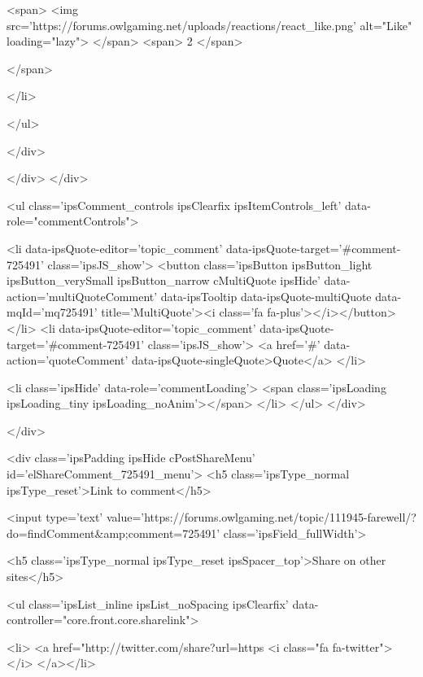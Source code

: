 							<span>
								<img src='https://forums.owlgaming.net/uploads/reactions/react_like.png' alt="Like" loading="lazy">
							</span>
							<span>
								2
							</span>
					
						</span>
					
				</li>
			
		
	</ul>

					
				</div>
			
			
			
		</div>
	</div>

					
				
				<ul class='ipsComment_controls ipsClearfix ipsItemControls_left' data-role="commentControls">
					
						
							<li data-ipsQuote-editor='topic_comment' data-ipsQuote-target='#comment-725491' class='ipsJS_show'>
								<button class='ipsButton ipsButton_light ipsButton_verySmall ipsButton_narrow cMultiQuote ipsHide' data-action='multiQuoteComment' data-ipsTooltip data-ipsQuote-multiQuote data-mqId='mq725491' title='MultiQuote'><i class='fa fa-plus'></i></button>
							</li>
							<li data-ipsQuote-editor='topic_comment' data-ipsQuote-target='#comment-725491' class='ipsJS_show'>
								<a href='#' data-action='quoteComment' data-ipsQuote-singleQuote>Quote</a>
							</li>
						
						
						
					
					<li class='ipsHide' data-role='commentLoading'>
						<span class='ipsLoading ipsLoading_tiny ipsLoading_noAnim'></span>
					</li>
				</ul>
			</div>
		

		
	</div>

	

	



<div class='ipsPadding ipsHide cPostShareMenu' id='elShareComment_725491_menu'>
	<h5 class='ipsType_normal ipsType_reset'>Link to comment</h5>
	
		
	
	
	<input type='text' value='https://forums.owlgaming.net/topic/111945-farewell/?do=findComment&amp;comment=725491' class='ipsField_fullWidth'>

	
	<h5 class='ipsType_normal ipsType_reset ipsSpacer_top'>Share on other sites</h5>
	

	<ul class='ipsList_inline ipsList_noSpacing ipsClearfix' data-controller="core.front.core.sharelink">
		
			<li>
<a href="http://twitter.com/share?url=https%
	<i class="fa fa-twitter"></i>
</a></li>
		
